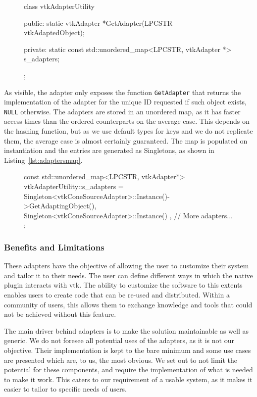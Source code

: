 \begin{figure}[ht!]
    \centering
    \begin{cpp}[label=lst:vtkadapterutility,caption={vtkAdapterUtility interface}]
class vtkAdapterUtility
{
public:
	static vtkAdapter *GetAdapter(LPCSTR vtkAdaptedObject);

private:
	static const std::unordered_map<LPCSTR, vtkAdapter *> s_adapters;
};
    \end{cpp}
\end{figure}

As visible, the adapter only exposes the function \verb|GetAdapter| that returns the implementation of the adapter for the unique ID requested if such object exists, \verb|NULL| otherwise. The adapters are stored in an unordered map, as it has faster access times than the ordered counterparts \cite{stdunord16, stdmapcp55} on the average case. This depends on the hashing function, but as we use default types for keys and we do not replicate them, the average case is almost certainly guaranteed. The map is populated on instantiation and the entries are generated as Singletons, as shown in Listing~\ref{lst:adaptersmap}.

\begin{figure}[ht!]
    \centering
    \begin{cpp}[label=lst:adaptersmap,caption={Example of adapters register instantiation.}]
const std::unordered_map<LPCSTR, vtkAdapter*> vtkAdapterUtility::s_adapters =
{
	{ Singleton<vtkConeSourceAdapter>::Instance()->GetAdaptingObject(), Singleton<vtkConeSourceAdapter>::Instance() },
	// More adapters...
};
    \end{cpp}
\end{figure}

\subsubsection{Benefits and Limitations}

These adapters have the objective of allowing the user to customize their system and tailor it to their needs. The user can define different ways in which the native plugin interacts with \acrshort{vtk}. The ability to customize the software to this extents enables users to create code that can be re-used and distributed. Within a community of users, this allows them to exchange knowledge and tools that could not be achieved without this feature.

The main driver behind adapters is to make the solution maintainable as well as generic. We do not foresee all potential uses of the adapters, as it is not our objective. Their implementation is kept to the bare minimum and some use cases are presented which are, to us, the most obvious. We set out to not limit the potential for these components, and require the implementation of what is needed to make it work. This caters to our requirement of a usable system, as it makes it easier to tailor to specific needs of users.

